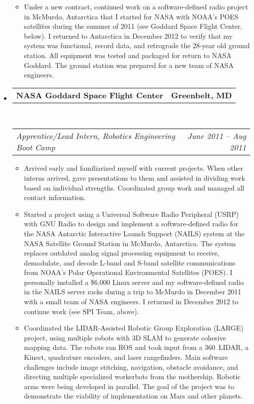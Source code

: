 \documentclass[10pt,letterpaper]{article}
\makeatletter
\newcommand{\headerrow}[2]
{\begin{tabular*}{\linewidth}{l@{\extracolsep{\fill}}r}
	#1 & #2 \\
\end{tabular*}}
\makeatother
\begin{document}
\begin{itemize}
\begin{itemize}
        \item Under a new contract, continued work on a software-defined radio
            project in McMurdo, Antarctica that I started for NASA with NOAA's
            POES satellites during the summer of 2011 (see Goddard Space Flight
            Center, below).  I returned to Antarctica in December 2012 to
            verify that my system was functional, record data, and retrograde
            the 28-year old ground station.  All equipment was tested and
            packaged for return to NASA Goddard.  The ground station was
            prepared for a new team of NASA engineers.
	\end{itemize}

	\item
	\headerrow
		{\textbf{NASA Goddard Space Flight Center}}
		{\textbf{Greenbelt, MD}}
	\\
	\headerrow
		{\emph{Apprentice/Lead Intern, Robotics Engineering Boot Camp}}
		{\emph{June 2011 -- Aug 2011}}
	\begin{itemize}
        \item Arrived early and familiarized myself with current projects.
            When other interns arrived, gave presentations to them and assisted
            in dividing work based on individual strengths.  Coordinated group
            work and managed all contact information.

        \item Started a project using a Universal Software Radio Peripheral
            (USRP) with GNU Radio to design and implement a software-defined
            radio for the NASA Antarctic Interactive Launch Support (NAILS)
            system at the NASA Satellite Ground Station in McMurdo, Antarctica.
            The system replaces outdated analog signal processing equipment to
            receive, demodulate, and decode L-band and S-band satellite
            communications from NOAA's Polar Operational Environmental
            Satellites (POES).  I personally installed a \$6,000 Linux server
            and my software-defined radio in the NAILS server racks during a
            trip to McMurdo in December 2011 with a small team of NASA
            engineers.  I returned in December 2012 to continue work (see SPI
            Team, above).

        \item Coordinated the LIDAR-Assisted Robotic Group Exploration (LARGE)
            project, using multiple robots with 3D SLAM to generate cohesive
            mapping data.  The robots ran ROS and took input from a 360\degree\
            LIDAR, a Kinect, quadrature encoders, and laser rangefinders.  Main
            software challenges include image stitching, navigation, obstacle
            avoidance, and directing multiple specialized workerbots from the
            mothership.  Robotic arms were being developed in parallel.  The
            goal of the project was to demonstrate the viability of
            implementation on Mars and other planets.
	\end{itemize}


\end{itemize}
\end{document}
